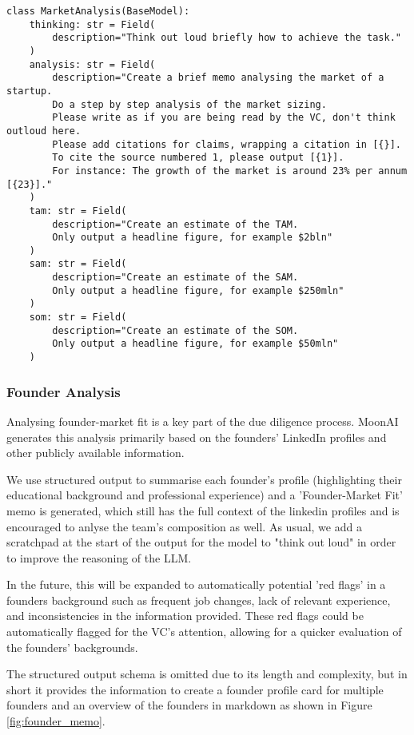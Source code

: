 \documentclass[a4paper, oneside]{discothesis}
\begin{document}
\begin{verbatim}
class MarketAnalysis(BaseModel):
    thinking: str = Field(
        description="Think out loud briefly how to achieve the task."
    )
    analysis: str = Field(
        description="Create a brief memo analysing the market of a startup. 
        Do a step by step analysis of the market sizing. 
        Please write as if you are being read by the VC, don't think outloud here. 
        Please add citations for claims, wrapping a citation in [{}]. 
        To cite the source numbered 1, please output [{1}]. 
        For instance: The growth of the market is around 23% per annum [{23}]."
    )
    tam: str = Field(
        description="Create an estimate of the TAM. 
        Only output a headline figure, for example $2bln"
    )
    sam: str = Field(
        description="Create an estimate of the SAM. 
        Only output a headline figure, for example $250mln"
    )
    som: str = Field(
        description="Create an estimate of the SOM. 
        Only output a headline figure, for example $50mln"
    )
\end{verbatim}


\subsubsection{Founder Analysis}
Analysing founder-market fit is a key part of the due diligence process. MoonAI generates this analysis primarily based on the founders' LinkedIn profiles and other publicly available information. 

We use structured output to summarise each founder's profile (highlighting their educational background and professional experience) and  a 'Founder-Market Fit' memo is generated, which still has the full context of the linkedin profiles and is encouraged to anlyse the team's composition as well. As usual, we add a scratchpad at the start of the output for the model to "think out loud" in order to improve the reasoning of the LLM. 

In the future, this will be expanded to automatically potential 'red flags' in a founders background such as frequent job changes, lack of relevant experience, and inconsistencies in the information provided. These red flags could be automatically flagged for the VC's attention, allowing for a quicker evaluation of the founders' backgrounds.

The structured output schema is omitted due to its length and complexity, but in short it provides the information to create a founder profile card for multiple founders and an overview of the founders in markdown as shown in Figure \ref{fig:founder_memo}.
\end{document}
